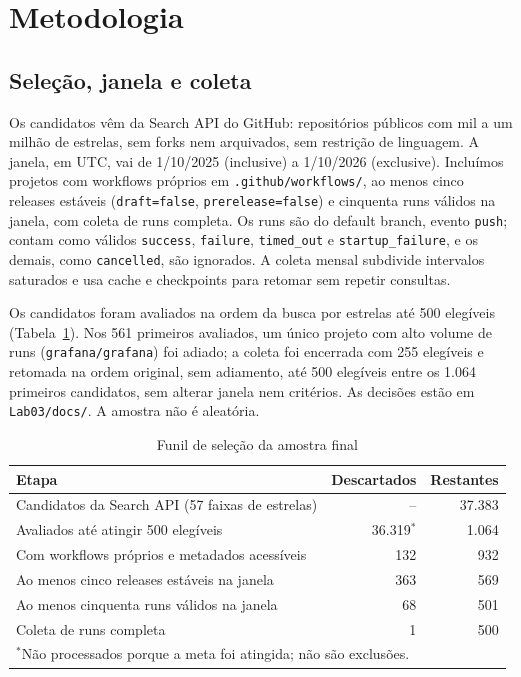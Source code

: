 \section{Metodologia}
\label{sec:metodologia}

\subsection{Seleção, janela e coleta}
Os candidatos vêm da Search API do GitHub: repositórios públicos com mil a um
milhão de estrelas, sem forks nem arquivados, sem restrição de linguagem. A
janela, em UTC, vai de 1/10/2025 (inclusive) a 1/10/2026 (exclusive).
Incluímos projetos com workflows próprios em \texttt{.github/workflows/}, ao
menos cinco releases estáveis (\texttt{draft=false}, \texttt{prerelease=false})
e cinquenta runs válidos na janela, com coleta de runs completa. Os runs são do
default branch, evento \texttt{push}; contam como válidos \texttt{success},
\texttt{failure}, \texttt{timed\_out} e \texttt{startup\_failure}, e os demais,
como \texttt{cancelled}, são ignorados. A coleta mensal subdivide intervalos
saturados e usa cache e checkpoints para retomar sem repetir consultas.

Os candidatos foram avaliados na ordem da busca por estrelas até 500 elegíveis
(Tabela~\ref{tab:funil}). Nos 561 primeiros avaliados, um único projeto com
alto volume de runs (\texttt{grafana/grafana}) foi adiado; a coleta foi
encerrada com 255 elegíveis e retomada na ordem original, sem adiamento, até
500 elegíveis entre os 1.064 primeiros candidatos, sem alterar janela nem
critérios. As decisões estão em \texttt{Lab03/docs/}. A amostra não é aleatória.

\begin{table}[ht]
\centering
\caption{Funil de seleção da amostra final}
\label{tab:funil}
\small
\begin{tabular}{lrr}
\hline
Etapa & Descartados & Restantes \\
\hline
Candidatos da Search API (57 faixas de estrelas) & -- & 37.383 \\
Avaliados até atingir 500 elegíveis & 36.319$^{*}$ & 1.064 \\
Com workflows próprios e metadados acessíveis & 132 & 932 \\
Ao menos cinco releases estáveis na janela & 363 & 569 \\
Ao menos cinquenta runs válidos na janela & 68 & 501 \\
Coleta de runs completa & 1 & 500 \\
\hline
\multicolumn{3}{l}{\footnotesize $^{*}$Não processados porque a meta foi atingida; não são exclusões.} \\
\end{tabular}
\end{table}


